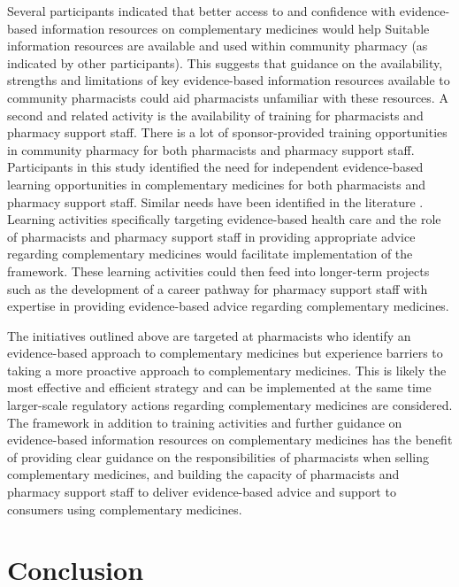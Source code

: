 \documentclass[11pt,a4paper]{article}
\begin{document}
Several participants indicated that better access to and confidence with
evidence-based information resources on complementary medicines would
help Suitable information resources are available and used within
community pharmacy (as indicated by other participants). This suggests
that guidance on the availability, strengths and limitations of key
evidence-based information resources available to community pharmacists
could aid pharmacists unfamiliar with these resources. A second and
related activity is the availability of training for pharmacists and
pharmacy support staff. There is a lot of sponsor-provided training
opportunities in community pharmacy for both pharmacists and pharmacy
support staff. Participants in this study identified the need for
independent evidence-based learning opportunities in complementary
medicines for both pharmacists and pharmacy support staff. Similar needs
have been identified in the literature
\autocites{Tiralongo2010}{Iyer2016a}. Learning activities specifically
targeting evidence-based health care and the role of pharmacists and
pharmacy support staff in providing appropriate advice regarding
complementary medicines would facilitate implementation of the
framework. These learning activities could then feed into longer-term
projects such as the development of a career pathway for pharmacy
support staff with expertise in providing evidence-based advice
regarding complementary medicines.

The initiatives outlined above are targeted at pharmacists who identify
an evidence-based approach to complementary medicines but experience
barriers to taking a more proactive approach to complementary medicines.
This is likely the most effective and efficient strategy and can be
implemented at the same time larger-scale regulatory actions regarding
complementary medicines are considered. The framework in addition to
training activities and further guidance on evidence-based information
resources on complementary medicines has the benefit of providing clear
guidance on the responsibilities of pharmacists when selling
complementary medicines, and building the capacity of pharmacists and
pharmacy support staff to deliver evidence-based advice and support to
consumers using complementary medicines.

\section{Conclusion}\label{conclusion}

\printbibliography[title=References]
\end{document}
